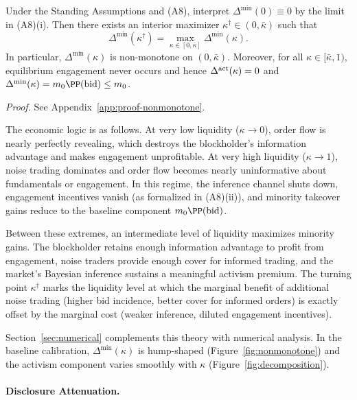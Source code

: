 \begin{proposition}
\label{prop:nonmonotone}
Under the Standing Assumptions and \textup{(A8)}, interpret $\Delta^{\min}(0)\equiv 0$ by the limit in \textup{(A8)(i)}. Then there exists an interior maximizer $\kappa^{\dagger}\in(0,\bar{\kappa})$ such that
\[
\Delta^{\min}(\kappa^{\dagger})=\max_{\kappa\in[0,\bar{\kappa}]}\Delta^{\min}(\kappa).
\]
In particular, $\Delta^{\min}(\kappa)$ is non-monotone on $(0,\bar{\kappa})$. Moreover, for all $\kappa\in[\bar{\kappa},1)$, equilibrium engagement never occurs and hence $\Delta^{\textup{act}}(\kappa)=0$ and $\Delta^{\min}(\kappa)=m_0\PP(\textup{bid})\le m_0$.
\end{proposition}
\textit{Proof.} See Appendix~\ref{app:proof-nonmonotone}.

The economic logic is as follows. At very low liquidity ($\kappa \to 0$), order flow is nearly perfectly revealing, which destroys the blockholder's information advantage and makes engagement unprofitable. At very high liquidity ($\kappa \to 1$), noise trading dominates and order flow becomes nearly uninformative about fundamentals or engagement. In this regime, the inference channel shuts down, engagement incentives vanish (as formalized in \textup{(A8)(ii)}), and minority takeover gains reduce to the baseline component $m_0\PP(\textup{bid})$.

Between these extremes, an intermediate level of liquidity maximizes minority gains. The blockholder retains enough information advantage to profit from engagement, noise traders provide enough cover for informed trading, and the market's Bayesian inference sustains a meaningful activism premium. The turning point $\kappa^{\dagger}$ marks the liquidity level at which the marginal benefit of additional noise trading (higher bid incidence, better cover for informed orders) is exactly offset by the marginal cost (weaker inference, diluted engagement incentives).

Section~\ref{sec:numerical} complements this theory with numerical analysis. In the baseline calibration, $\Delta^{\min}(\kappa)$ is hump-shaped (Figure~\ref{fig:nonmonotone}) and the activism component varies smoothly with $\kappa$ (Figure~\ref{fig:decomposition}).

\paragraph{Disclosure Attenuation.}

